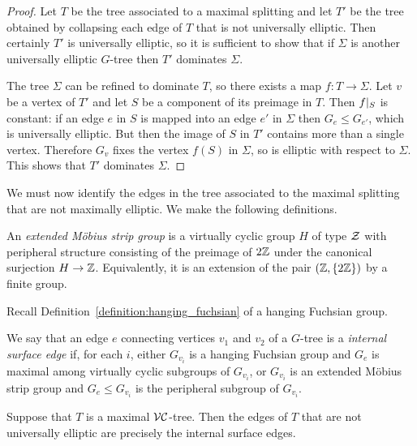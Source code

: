 \begin{proof} Let $T$ be the tree associated to a maximal splitting and let
$T'$ be the tree obtained by collapsing each edge of $T$ that is not
universally elliptic. Then certainly $T'$ is universally elliptic, so it is
sufficient to show that if $\Sigma$ is another universally elliptic
$G$-tree then $T'$ dominates $\Sigma$.

The tree $\Sigma$ can be refined to dominate $T$, so there exists a map $f
\colon T \to \Sigma$. Let $v$ be a vertex of $T'$ and let $S$ be a
component of its preimage in $T$. Then $f\vert_{S}$ is constant: if
an edge $e$ in $S$ is mapped into an edge $e'$ in $\Sigma$ then $G_e \leq
 G_{e'}$, which is universally elliptic. But then the image of $S$ in
$T'$ contains more than a single vertex. Therefore $G_v$ fixes the
vertex $f(S)$ in $\Sigma$, so is elliptic with respect to $\Sigma$. This shows that
$T'$ dominates $\Sigma$.\end{proof}

We must now identify the edges in the tree associated to the maximal splitting
that are not maximally elliptic. We make the following definitions.

\begin{definition}\label{definition:mobius_strip_group} 
    An \emph{extended M\"obius strip group} is a virtually cyclic group $H$ of type $\mathcal{Z}$ with peripheral structure consisting of the preimage of $2\mathbb{Z}$ under the canonical surjection $H \to \mathbb{Z}$.  
    Equivalently, it is an extension of the pair $(\mathbb{Z}, \{2\mathbb{Z}\})$ by a finite group.
\end{definition}

Recall Definition~\ref{definition:hanging_fuchsian} of a hanging Fuchsian group.

\begin{definition}\label{defn:surfaceboundaryedges} We say that an edge $e$
connecting vertices $v_1$ and $v_2$ of a $G$-tree is a \emph{internal
surface edge} if, for each $i$, either $G_{v_i}$ is a hanging Fuchsian
group and $G_e$ is maximal among virtually cyclic subgroups of
$G_{v_i}$, or $G_{v_i}$ is an extended M\"obius strip group and
$G_e \leq G_{v_i}$ is the peripheral subgroup of $G_{v_i}$.
\end{definition}

\begin{lemma}\label{lemma:internal_surface_edges} 
  Suppose that $T$ is a maximal $\mathcal{VC}$-tree.
  Then the edges of $T$ that are not universally elliptic are precisely the internal surface edges.
\end{lemma}

